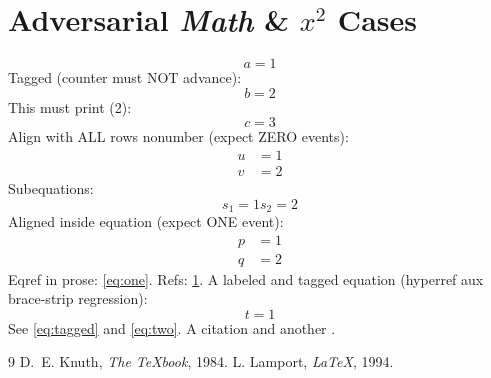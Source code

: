\documentclass{article}
\begin{document}
\section{Adversarial \emph{Math} \& $x^2$ Cases}
\label{sec:adv}
\begin{equation}\label{eq:one} a=1 \end{equation}
Tagged (counter must NOT advance):
\begin{equation} b=2 \tag{B} \end{equation}
This must print (2):
\begin{equation}\label{eq:two} c=3 \end{equation}
Align with ALL rows nonumber (expect ZERO events):
\begin{align}
  u &= 1 \nonumber \\
  v &= 2 \nonumber
\end{align}
Subequations:
\begin{subequations}
\begin{equation}\label{eq:sub-a} s_1=1 \end{equation}
\begin{equation} s_2=2 \end{equation}
\end{subequations}
Aligned inside equation (expect ONE event):
\begin{equation}\label{eq:aligned}
\begin{aligned} p &= 1 \\ q &= 2 \end{aligned}
\end{equation}
Eqref in prose: \eqref{eq:one}. Refs: \ref{sec:adv}.
A labeled and tagged equation (hyperref aux brace-strip regression):
\begin{equation}\label{eq:tagged} t=1 \tag{T1} \end{equation}
See \eqref{eq:tagged} and \eqref{eq:two}.
A citation \citep{knuth1984texbook} and another \citet[see][chap.~2]{lamport1994latex}.
\begin{thebibliography}{9}
 D.~E. Knuth, \emph{The TeXbook}, 1984.
 L. Lamport, \emph{LaTeX}, 1994.
\end{thebibliography}
\end{document}
